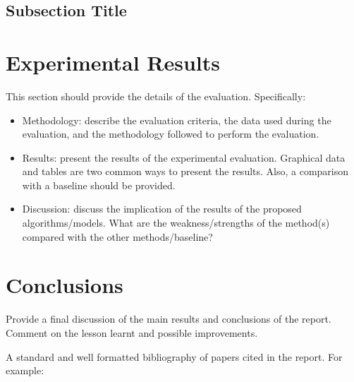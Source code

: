 \documentclass{svproc}
\begin{document}
\subsection{Subsection Title}

\section{Experimental Results}
This section should provide the details of the evaluation. Specifically:
\begin{itemize}
\item Methodology: describe the evaluation criteria, the data used during the evaluation, and the methodology followed to perform the evaluation. 
\item Results: present the results of the experimental evaluation. Graphical data and tables are two common ways to present the results. Also, a comparison with a baseline should be provided.
\item Discussion: discuss the implication of the results of the proposed algorithms/models. What are the weakness/strengths of the method(s) compared with the other methods/baseline?
\end{itemize}

\section{Conclusions}
Provide a final discussion of the main results and conclusions of the report. Comment on the lesson learnt and possible improvements.


A standard and well formatted bibliography of papers cited in the report. For example:
\end{document}
